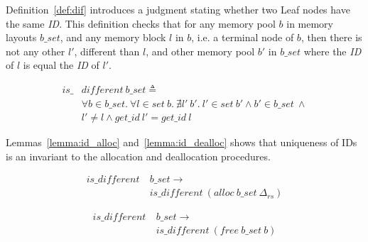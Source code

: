 Definition~\ref{def:dif} introduces a judgment stating whether two Leaf nodes have the same \emph{ID}. This definition checks that for any memory pool $b$ in memory layouts $b\_set$, and any memory block $l$ in $b$, i.e. a terminal node of $b$, then there is not any other $l'$, different than $l$, and other memory pool $b'$ in $b\_set$ where the \emph{ID} of $l$ is equal the \emph{ID} of $l'$.

\begin{definition} 
\label{def:dif}
\end{definition}
\vspace{-7pt}
\begin{align*}
is\_&different\ b\_set \triangleq\\
&\forall b \in b\_set.\ \forall l \in set\ b.\ \nexists l'\ b'.\ l' \in set\ b' \wedge b' \in b\_set\ \wedge\\
&l' \ne l \wedge get\_id\ l' = get\_id\ l
\end{align*}
\vspace{-12pt}

Lemmas~\ref{lemma:id_alloc} and~\ref{lemma:id_dealloc} shows that uniqueness of IDs is an invariant to the allocation and deallocation procedures.


\begin{lemma}  \label{lemma:id_alloc}
\begin{align*}
is\_different\ &b\_set \longrightarrow\\
&is\_different\ (alloc\ b\_set\ \Delta_{rs})
\end{align*}
\end{lemma}

\begin{lemma}  \label{lemma:id_dealloc}
\begin{align*}
is\_different\ &b\_set \longrightarrow\\
&is\_different\ (free\ b\_set\ b)
\end{align*}
\end{lemma}


